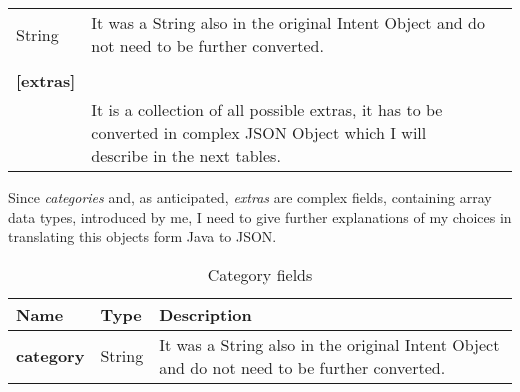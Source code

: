 \begin{table}[h]
\begin{center}
\begin{tabular}{>{\centering\arraybackslash} m{}p{}p{}}
\begin{minipage}[t]{0.25\textwidth}
			\centering
			String
		\end{minipage} & \begin{minipage}[t]{0.55\textwidth}
			It was a String also in the original Intent Object and do not need to be further converted.
		\end{minipage}\\%
		&&\\
			\centering\textbf{[extras]}\footnotemark[1] & \begin{minipage}[t]{0.25\textwidth}
			\centering
			Array\\<Bundle Object>\footnotemark[2]
		\end{minipage} & \begin{minipage}[t]{0.55\textwidth}
			It is a collection of all possible extras, it has to be converted in complex JSON Object which I will describe in the next tables.
		\end{minipage}\\%
			\bottomrule
		\end{tabular}
	\end{center}
\end{table}

Since \textit{categories} and, as anticipated, \textit{extras} are complex fields, containing array data types, introduced by me, I need to give further explanations of my choices in translating this objects form Java to JSON.

\begin{table}[h]
	\caption{Category fields}
	\label{tab:category}
	\centering
	\begin{center}
		
		\begin{tabular}{>{\centering\arraybackslash} m{}p{}p{0.55\textwidth}}
			
			\toprule
			\centering\textbf{Name} & \centering\textbf{Type}  &	\textbf{Description} \\
			\midrule
			\centering\textbf{category} & \begin{minipage}[t]{0.25\textwidth}
				\centering
				String
			\end{minipage} & \begin{minipage}[t]{}
				It was a String also in the original Intent Object and do not need to be further converted.
			\end{minipage}\\%
			\bottomrule
		\end{tabular}
	\end{center}
\end{table}

